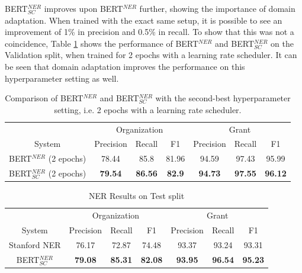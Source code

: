 \documentclass{report}
\theoremstyle{definition}
\theoremstyle{remark}
\begin{document}
BERT$^{NER}_{SC}$ improves upon BERT$^{NER}$ further, showing the importance of domain adaptation. When trained with the exact same setup, it is possible to see an improvement of 1\% in precision and 0.5\% in recall. To show that this was not a coincidence, Table \ref{tab:bertsccompareother} shows the performance of BERT$^{NER}$ and BERT$^{NER}_{SC}$ on the Validation split, when trained for 2 epochs with a learning rate scheduler. It can be seen that domain adaptation improves the performance on this hyperparameter setting as well.

\begin{table}
    \centering
    \begin{tabular}{c| c c c| c c c}
    &\multicolumn{3}{c|}{Organization}&\multicolumn{3}{c}{Grant} \\
    System&Precision&Recall&F1&Precision&Recall&F1\\
    \hline
    BERT$^{NER}$ (2 epochs) &  78.44&85.8&81.96&94.59&97.43&95.99
 \\[0.7ex]
    BERT$^{NER}_{SC}$ (2 epochs) &  \textcolor{ao}{\textbf{79.54}}&\textcolor{ao}{\textbf{86.56}}&\textcolor{ao}{\textbf{82.9}}&\textcolor{ao}{\textbf{94.73}}&\textcolor{ao}{\textbf{97.55}}&\textcolor{ao}{\textbf{96.12}}
  \\[0.7ex]
    \end{tabular}
    \caption{Comparison of BERT$^{NER}$ and BERT$^{NER}_{SC}$ with the second-best hyperparameter setting, i.e. 2 epochs with a learning rate scheduler.}
    \label{tab:bertsccompareother}
\end{table}

\begin{table}
    \centering
    \begin{tabular}{c| c c c| c c c}
    &\multicolumn{3}{c|}{Organization}&\multicolumn{3}{c}{Grant} \\
    System&Precision&Recall&F1&Precision&Recall&F1\\
    \hline
    Stanford NER &  76.17 & 72.87  & 74.48 & 93.37   & 93.24  & 93.31
 \\[0.7ex]
    BERT$^{NER}_{SC}$ &  \textcolor{ao}{\textbf{79.08} }& \textcolor{ao}{\textbf{85.31} }& \textcolor{ao}{\textbf{82.08}}& \textcolor{ao}{\textbf{93.95}}&   \textcolor{ao}{\textbf{96.54}}&   \textcolor{ao}{\textbf{95.23}}
  \\[0.7ex]
    \end{tabular}
    \caption{NER Results on Test split}
    \label{tab:all_ner_results_test}
\end{table}
\end{document}
